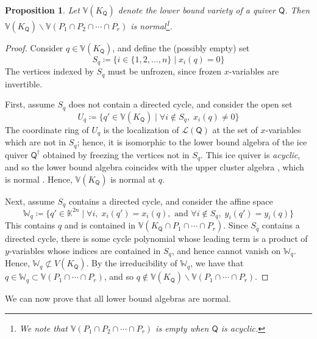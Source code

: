 \documentclass[10pt]{amsart}
\numberwithin{equation}{section}
\newtheorem{prop}[thm]{Proposition}
\theoremstyle{definition}
\theoremstyle{remark}
\renewcommand{\L}{\mathcal{L}}%
\newcommand{\1}{^{-1}}
\def\Q{\mathsf{Q}}
\begin{document}
\begin{prop}\label{prop:openSetIsNormal}
Let $\mathbb{V}(K_\Q)$ denote the lower bound variety of a quiver $\Q$.  Then $\mathbb{V}(K_\Q)\smallsetminus \mathbb{V}(P_1\cap P_2 \cap \cdots \cap P_r)$ is normal\footnote{We note that $\mathbb{V}(P_1\cap P_2\cap\cdots\cap P_r)$ is empty when $\Q$ is acyclic.}.
\end{prop}
\begin{proof}
Consider $q\in \mathbb{V}(K_\Q)$, and define the (possibly empty) set %
\[ S_q \coloneqq \{ i\in \{1,2,\dots,n \} \mid x_i(q) =0 \} \]
The vertices indexed by $S_q$ must be unfrozen, since frozen $x$-variables are invertible.

First, assume $S_q$ does not contain a directed cycle, and consider the open set
\[ U_q \coloneqq \{ q'\in \mathbb{V}(K_\Q) \mid \forall i\not\in S_q,\;x_i(q)\neq 0\} \]
The coordinate ring of $U_q$ is the localization of $\L(\Q)$ at the set of $x$-variables which are not in $S_q$; hence, it is isomorphic to the lower bound algebra of the ice quiver $\Q^\dagger$ obtained by freezing the vertices not in $S_q$.  This ice quiver is \emph{acyclic}, and so the lower bound algebra coincides with the upper cluster algebra \cite{BFZ05}, which is normal \cite{MulLA}.  Hence, $\mathbb{V}(K_\Q)$ is normal at $q$.

Next, assume $S_q$ contains a directed cycle, and consider the affine space 
\[ \mathbb{W}_q \coloneqq \{ q' \in \mathbb{K}^{2n} \mid \forall i, \;x_i(q')=x_i(q),\text{ and } \forall i \not\in S_q,\; y_i(q')=y_i(q)\} \]
This contains $q$ and is contained in $\mathbb{V}(K_\Q\cap P_1 \cap \cdots \cap P_r)$.  Since $S_q$ contains a directed cycle, there is some cycle polynomial whose leading term is a product of $y$-variables whose indices are contained in $S_q$, and hence cannot vanish on $\mathbb{W}_q$.  Hence, $\mathbb{W}_q\not\subset \mathbb{}V(K_\Q)$. By the irreducibility of $\mathbb{W}_q$, we have that $q\in\mathbb{W}_q\subset \mathbb{V}(P_1\cap \cdots\cap P_r)$, and so $q\not\in \mathbb{V}(K_\Q)\smallsetminus \mathbb{V}(P_1\cap \cdots \cap P_r)$.
\end{proof}


We can now prove that all lower bound algebras are normal.
\end{document}
